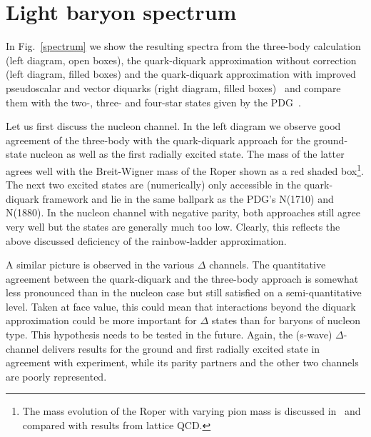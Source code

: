 \documentclass[epj,twocolumn]{webofc}
\begin{document}
\section{Light baryon spectrum}\label{sec-3}


In Fig.~\ref{spectrum} we show the resulting spectra from the three-body calculation (left diagram, open boxes), the quark-diquark approximation without correction
(left diagram, filled boxes) and the quark-diquark approximation with improved pseudoscalar and vector diquarks (right diagram, filled boxes)~\cite{Eichmann:2016hgl}
and compare them with the two-, three- and four-star states given by the PDG~\cite{Agashe:2014kda}.

Let us first discuss the nucleon channel. In the left diagram we observe good agreement of the three-body with the quark-diquark
approach for the ground-state nucleon as well as the first radially excited state. The mass of the latter agrees well with
the Breit-Wigner mass of the Roper shown as a red shaded box\footnote{The mass evolution of the Roper with varying pion mass
is discussed in~\cite{Eichmann:2016hgl} and compared with results from lattice QCD.}.
The next two excited states are (numerically) only accessible in the quark-diquark
framework and lie in the same ballpark as the PDG's N(1710) and N(1880). In the nucleon channel with negative parity, both approaches
still agree very well but the states are generally much too low. Clearly, this reflects the above discussed deficiency of the
rainbow-ladder approximation.

A similar picture is observed in the various $\Delta$ channels. The quantitative agreement
between the quark-diquark and the three-body approach is somewhat less pronounced than in the nucleon case but still satisfied
on a semi-quantitative level. Taken at face value, this could mean that interactions beyond the diquark approximation could be more important
for $\Delta$ states than for baryons of nucleon type. This hypothesis needs to be tested in the future.
Again, the (s-wave) $\Delta$-channel delivers results for the ground and first radially excited state in agreement with experiment,
while its parity partners and the other two channels are poorly represented.
\end{document}
